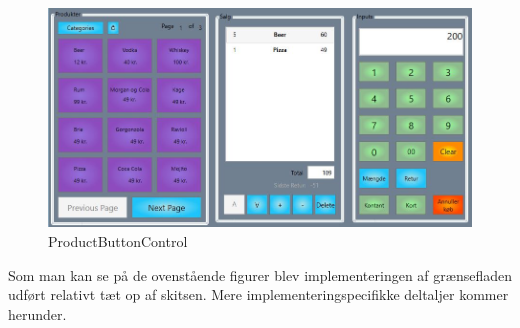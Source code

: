 \begin{figure}[H]
	\centering
	\includegraphics[width=1\textwidth]{Systemdesign/Frontend/pics/GUI}
	\caption{ProductButtonControl}
	\label{fig:EndeligeGUI}
\end{figure}

Som man kan se på de ovenstående figurer blev implementeringen af grænsefladen udført relativt tæt op af skitsen. Mere implementeringspecifikke deltaljer kommer herunder.



